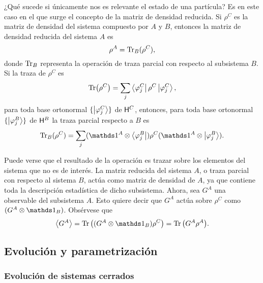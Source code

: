 ¿Qué sucede si únicamente nos es relevante el estado de una partícula? Es en este caso en el que surge el concepto de la matriz de densidad reducida. Si $\rho^{C}$ es la matriz de densidad del sistema compuesto por $A$ y $B$, entonces la matriz de densidad reducida del sistema $A$ es
\begin{equation}
    \rho^{A}=\Tr_{B}(\rho^{C}),\nonumber
\end{equation}
donde $\Tr_{B}$ representa la operación de traza parcial con respecto al subsistema $B$. Si la traza de $\rho^{C}$ es 
\begin{equation}
    \Tr(\rho^{C})=\sum_{j}\bra{\varphi^{C}_{j}}\rho^{C}\ket{\varphi^{C}_{j}},\nonumber
\end{equation}
para toda base ortonormal $\{\ket{\varphi^{C}_{j}}\}$ de ${\sf H}^{C}$, entonces, para toda base ortonormal $\{\ket{\varphi^{B}_{j}}\}$ de ${\sf H}^{B}$  la traza parcial respecto a $B$ es \cite{Hardy}
\begin{equation}\label{eq:Ch1PartialTrace}
    \Tr_{B}(\rho^{C})=\sum_{j}(\Id^{A}\otimes \bra{\varphi^{B}_{j}})\rho^{C}(\Id^{A}\otimes \ket{\varphi^{B}_{j}}).
\end{equation}


Puede verse que el resultado de la operación es trazar sobre los elementos del sistema que no es de interés. La matriz reducida del sistema $A$, o traza parcial con respecto al sistema $B$, actúa como matriz de densidad de $A$, ya que contiene toda la descripción estadística de dicho subsistema. Ahora, sea $G^{A}$ una observable del subsistema $A$. Esto quiere decir que $G^{A}$ actúa sobre $\rho^{C}$ como $(G^{A}\otimes \Id_{B})$. Obsérvese que
\begin{equation}
    \expval{G^{A}}=\Tr\qty((G^A\otimes \Id_B)\rho^C)=\Tr \qty( G^A \rho^A ).\nonumber
\end{equation}

\subsection{Evolución y parametrización}
\label{subsec:ch2_evol_param}


\subsubsection{Evolución de sistemas cerrados}

